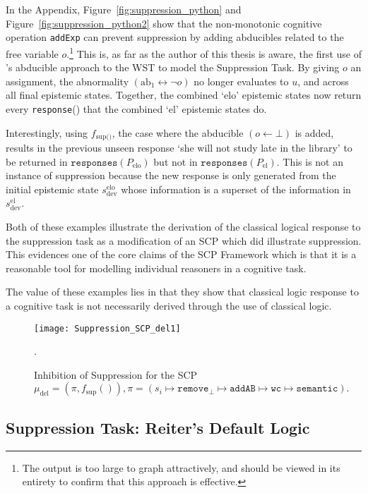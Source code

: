 In the Appendix, Figure~\ref{fig:suppression_python} and Figure~\ref{fig:suppression_python2}  show that the non-monotonic cognitive operation \texttt{addExp} can prevent suppression by adding abducibles related to the  free variable $o$.\footnote{The output is too large to graph attractively, and should be viewed in its entirety to confirm that this approach is effective.} This is, as far as the author of this thesis is aware, the first use of \cite{holldobler2015weak}'s abducible approach to the WST to model the Suppression Task. By giving $o$ an assignment, the abnormality $(\text{ab}_1\leftrightarrow \lnot o)$ no longer evaluates to $u$, and across all final epistemic states. Together, the combined `elo' epistemic states now return every \texttt{response}() that the combined `el' epistemic states do. 

Interestingly, using $f_\text{sup()}$, the case where the abducible $(o \leftarrow \bot)$ is added, results in the previous unseen response `she will not study late in the library' to be returned in $\texttt{responses}(P_\text{elo})$ but not in $\texttt{responses}(P_\text{el})$. This is not an instance of suppression because the new response is only generated from the initial epistemic state $s_\text{dev}^\text{elo}$ whose information is a superset of the information in $s_\text{dev}^\text{el}$.

Both of these examples illustrate the derivation of the classical logical response to the suppression task as a modification of an SCP which did illustrate suppression. This evidences one of the core claims of the SCP Framework which is that it is a reasonable tool for modelling individual reasoners in a cognitive task. 

The value of these examples lies in that they show that classical logic response to a cognitive task is not necessarily derived through the use of classical logic.

\begin{figure}
\centering \texttt{[image: Suppression\_SCP\_del1]}
\caption{Inhibition of Suppression for the SCP $\mu_\text{del}=(\pi,f_\text{sup}()), \pi = (s_i \longmapsto \texttt{remove}_\bot \longmapsto \texttt{addAB} \longmapsto \texttt{wc} \longmapsto \texttt{semantic}).$}.
\label{fig:Suppression_SCP_del1}
\end{figure}




\subsection{Suppression Task: Reiter's Default Logic}

